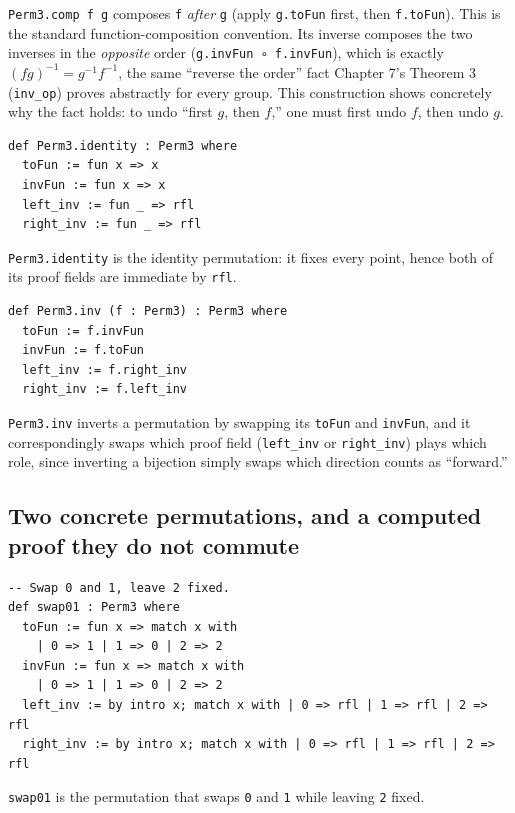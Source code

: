 \texttt{Perm3.comp f g} composes \texttt{f} \emph{after} \texttt{g} (apply \texttt{g.toFun} first, then \texttt{f.toFun}). This is the standard function-composition convention. Its inverse composes the two inverses in the \emph{opposite} order (\texttt{g.invFun ∘ f.invFun}), which is exactly \((fg)^{-1} = g^{-1}f^{-1}\), the same ``reverse the order'' fact Chapter 7's Theorem 3 (\texttt{inv\_\allowbreak{}op}) proves abstractly for every group. This construction shows concretely why the fact holds: to undo ``first \(g\), then \(f\),'' one must first undo \(f\), then undo \(g\).

\begin{lstlisting}
def Perm3.identity : Perm3 where
  toFun := fun x => x
  invFun := fun x => x
  left_inv := fun _ => rfl
  right_inv := fun _ => rfl
\end{lstlisting}

\texttt{Perm3.identity} is the identity permutation: it fixes every point, hence both of its proof fields are immediate by \texttt{rfl}.

\begin{lstlisting}
def Perm3.inv (f : Perm3) : Perm3 where
  toFun := f.invFun
  invFun := f.toFun
  left_inv := f.right_inv
  right_inv := f.left_inv
\end{lstlisting}

\texttt{Perm3.inv} inverts a permutation by swapping its \texttt{toFun} and \texttt{invFun}, and it correspondingly swaps which proof field (\texttt{left\_\allowbreak{}inv} or \texttt{right\_\allowbreak{}inv}) plays which role, since inverting a bijection simply swaps which direction counts as ``forward.''

\subsection{Two concrete permutations, and a computed proof they do not commute}\label{sec:06-groups:04-permutations-example:4}

\begin{lstlisting}
-- Swap 0 and 1, leave 2 fixed.
def swap01 : Perm3 where
  toFun := fun x => match x with
    | 0 => 1 | 1 => 0 | 2 => 2
  invFun := fun x => match x with
    | 0 => 1 | 1 => 0 | 2 => 2
  left_inv := by intro x; match x with | 0 => rfl | 1 => rfl | 2 => rfl
  right_inv := by intro x; match x with | 0 => rfl | 1 => rfl | 2 => rfl
\end{lstlisting}

\texttt{swap01} is the permutation that swaps \texttt{0} and \texttt{1} while leaving \texttt{2} fixed.

